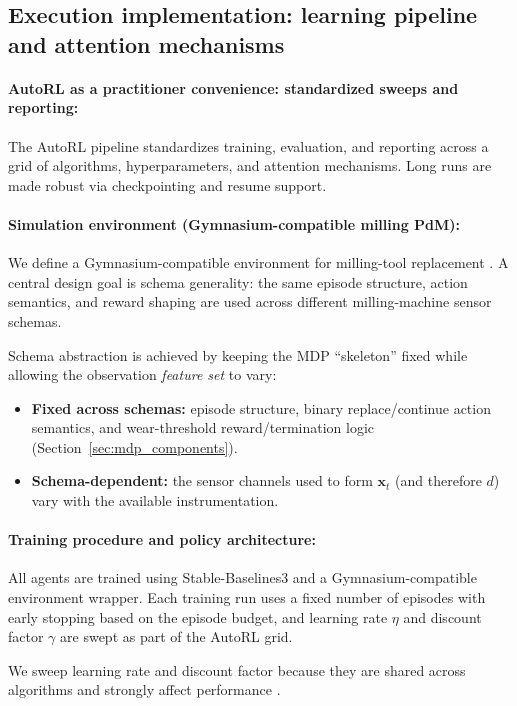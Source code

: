 \documentclass[sn-basic]{sn-jnl} %
\begin{document}
\subsection{Execution implementation: learning pipeline and attention mechanisms}\label{sec:algo_desc}
\paragraph{AutoRL as a practitioner convenience: standardized sweeps and reporting:}\label{sec:autorl}
The AutoRL pipeline standardizes training, evaluation, and reporting across a grid of algorithms, hyperparameters, and attention mechanisms. Long runs are made robust via checkpointing and resume support.

\paragraph{Simulation environment (Gymnasium-compatible milling PdM):}
We define a Gymnasium-compatible environment for milling-tool replacement \cite{Foundation2023}. A central design goal is schema generality: the same episode structure, action semantics, and reward shaping are used across different milling-machine sensor schemas.

Schema abstraction is achieved by keeping the MDP ``skeleton'' fixed while allowing the observation \emph{feature set} to vary:
\begin{itemize}
	\item \textbf{Fixed across schemas:} episode structure, binary replace/continue action semantics, and wear-threshold reward/termination logic (Section~\ref{sec:mdp_components}).
	\item \textbf{Schema-dependent:} the sensor channels used to form $\mathbf{x}_t$ (and therefore $d$) vary with the available instrumentation.
\end{itemize}

\paragraph{Training procedure and policy architecture:}
All agents are trained using Stable-Baselines3 and a Gymnasium-compatible environment wrapper. Each training run uses a fixed number of episodes with early stopping based on the episode budget, and learning rate $\eta$ and discount factor $\gamma$ are swept as part of the AutoRL grid.

We sweep learning rate and discount factor because they are shared across algorithms and strongly affect performance \cite{Henderson2019, Shala2022AutoRL, Eimer2023}.
  
\end{document}
